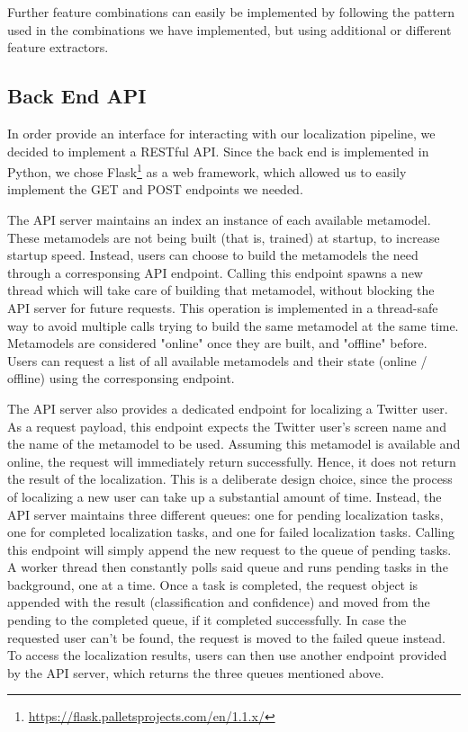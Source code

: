 \documentclass[10pt,a4paper]{article}
\begin{document}
Further feature combinations can easily be implemented by following the pattern used in the combinations we have implemented, but using additional or different feature extractors.

\subsection{Back End API}
In order provide an interface for interacting with our localization pipeline, we decided to implement a RESTful API. Since the back end is implemented in Python, we chose Flask\footnote{\href{https://flask.palletsprojects.com/en/1.1.x/}{https://flask.palletsprojects.com/en/1.1.x/}} as a web framework, which allowed us to easily implement the GET and POST endpoints we needed.

The API server maintains an index an instance of each available metamodel. These metamodels are not being built (that is, trained) at startup, to increase startup speed. Instead, users can choose to build the metamodels the need through a corresponsing API endpoint. Calling this endpoint spawns a new thread which will take care of building that metamodel, without blocking the API server for future requests. This operation is implemented in a thread-safe way to avoid multiple calls trying to build the same metamodel at the same time. Metamodels are considered "online" once they are built, and "offline" before. Users can request a list of all available metamodels and their state (online / offline) using the corresponsing endpoint.

The API server also provides a dedicated endpoint for localizing a Twitter user. As a request payload, this endpoint expects the Twitter user's screen name and the name of the metamodel to be used. Assuming this metamodel is available and online, the request will immediately return successfully. Hence, it does not return the result of the localization. This is a deliberate design choice, since the process of localizing a new user can take up a substantial amount of time. Instead, the API server maintains three different queues: one for pending localization tasks, one for completed localization tasks, and one for failed localization tasks. Calling this endpoint will simply append the new request to the queue of pending tasks. A worker thread then constantly polls said queue and runs pending tasks in the background, one at a time. Once a task is completed, the request object is appended with the result (classification and confidence) and moved from the pending to the completed queue, if it completed successfully. In case the requested user can't be found, the request is moved to the failed queue instead. To access the localization results, users can then use another endpoint provided by the API server, which returns the three queues mentioned above.
\end{document}
